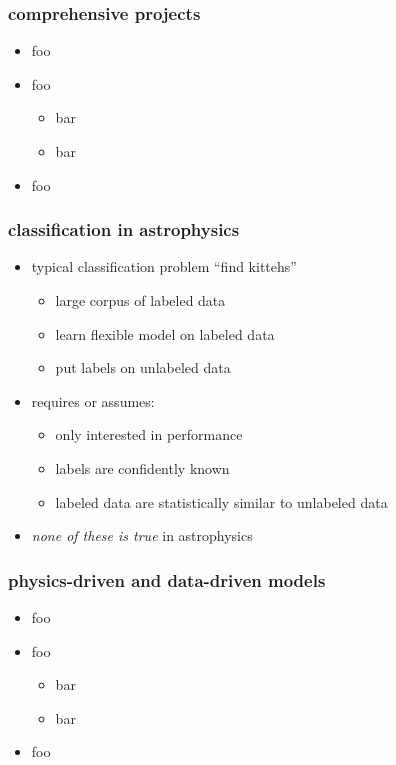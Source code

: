 \documentclass[pdftex]{beamer}
\begin{document}
  \item foo
  \end{itemize}
\end{frame}

\begin{frame}
  \frametitle{classification in astrophysics}
  \begin{itemize}
  \item typical classification problem ``find kittehs''
    \begin{itemize}
    \item large corpus of labeled data
    \item learn flexible model on labeled data
    \item put labels on unlabeled data
    \end{itemize}
  \item requires or assumes:
    \begin{itemize}
    \item only interested in performance
    \item labels are confidently known
    \item labeled data are statistically similar to unlabeled data
    \end{itemize}
  \item \emph{none of these is true} in astrophysics
  \end{itemize}
\end{frame}

\begin{frame}
  \frametitle{physics-driven and data-driven models}
  \begin{itemize}
  \item foo
  \item foo
    \begin{itemize}
    \item bar
    \item bar
    \end{itemize}
  \item foo
  \end{itemize}
\end{frame}
\end{document}
